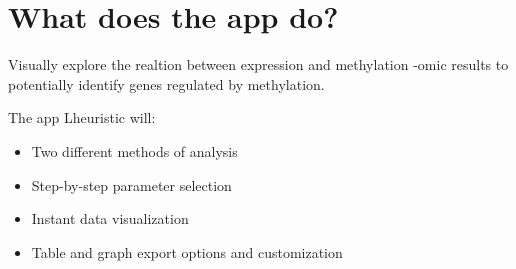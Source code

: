 \section{What does the app do?}

Visually explore the realtion between expression and methylation -omic results to potentially identify genes regulated by methylation.

The app Lheuristic will:

\begin{itemize}
\item Two different methods of analysis
\item Step-by-step parameter selection
\item Instant data visualization
\item Table and graph export options and customization
\end{itemize}



